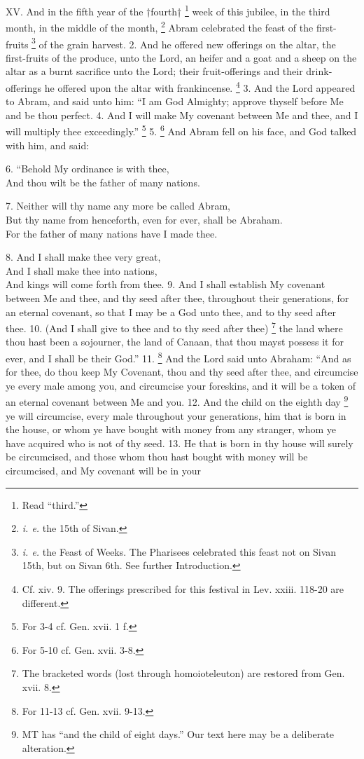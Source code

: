 
XV. And in the fifth year of the †fourth† \footnote{Read ``third.''} week of this jubilee, in the third month, in the middle of the month, \footnote{\emph{i. e.} the 15th of Sivan.} Abram celebrated the feast of the first-fruits \footnote{\emph{i. e.} the Feast of Weeks. The Pharisees celebrated this feast not on Sivan 15th, but on Sivan 6th. See further Introduction.} of the grain harvest. 2. And he offered new offerings on the altar, the first-fruits of the produce, unto the Lord, an heifer and a goat and a sheep on the altar as a burnt sacrifice unto the Lord; their fruit-offerings and their drink-offerings he offered upon the altar with frankincense. \footnote{Cf. xiv. 9. The offerings prescribed for this festival in Lev. xxiii. 118-20 are different.} 3. And the Lord appeared to Abram, and said unto him: ``I am God Almighty; approve thyself before Me and be thou perfect. 4. And I will make My covenant between Me and thee, and I will multiply thee exceedingly.'' \footnote{For 3-4 cf. Gen. xvii. 1 f.} 5. \footnote{For 5-10 cf. Gen. xvii. 3-8.} And Abram fell on his face, and God talked with him, and said:

6. ``Behold My ordinance is with thee,\\
And thou wilt be the father of many nations.

7. Neither will thy name any more be called Abram,\\
But thy name from henceforth, even for ever, shall be Abraham.\\
For the father of many nations have I made thee.

8. And I shall make thee very great,\\
And I shall make thee into nations,\\
And kings will come forth from thee. 9. And I shall establish My covenant between Me and thee, and thy seed after thee, throughout their generations, for an eternal covenant, so that I may be a God unto thee, and to thy seed after thee. 10. (And I shall give to thee and to thy seed after thee) \footnote{The bracketed words (lost through homoioteleuton) are restored from Gen. xvii. 8.} the land where thou hast been a sojourner, the land of Canaan, that thou mayst possess it for ever, and I shall be their God.'' 11. \footnote{For 11-13 cf. Gen. xvii. 9-13.} And the Lord said unto Abraham: ``And as for thee, do thou keep My Covenant, thou and thy seed after thee, and circumcise ye every male among you, and circumcise your foreskins, and it will be a token of an eternal covenant between Me and you. 12. And the child on the eighth day \footnote{MT has ``and the child of eight days.'' Our text here may be a deliberate alteration.} ye will circumcise, every male throughout your generations, him that is born in the house, or whom ye have bought with money from any stranger, whom ye have acquired who is not of thy seed. 13. He that is born in thy house will surely be circumcised, and those whom thou hast bought with money will be circumcised, and My covenant will be in your

